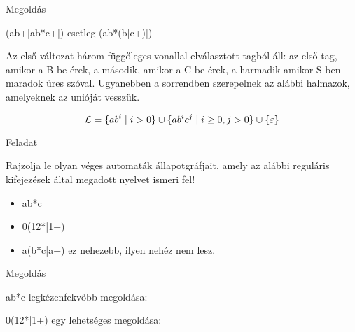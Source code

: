 \documentclass[
    ignorenonframetext
    ]{beamer}
\begin{document}
\begin{frame}
    {Megoldás}

    (ab+|ab*c+|) \quad esetleg \quad (ab*(b|c+)|)

    Az első változat három függőleges vonallal elválasztott tagból áll:
    az első tag, amikor a B-be érek, a második, amikor a C-be érek, a
    harmadik amikor S-ben maradok üres szóval. Ugyanebben a sorrendben
    szerepelnek az alábbi halmazok, amelyeknek az unióját vesszük.


    \[{\cal L} = \{ab^i \mid i>0\} \cup \{ab^ic^j \mid i \ge 0, j>0\}
    \cup \{\varepsilon\} \]
\end{frame}

\begin{frame}
    {Feladat}

    Rajzolja le olyan véges automaták állapotgráfjait, amely az alábbi
    reguláris kifejezések által megadott nyelvet ismeri fel!

    \begin{itemize}
        \item ab*c
        \item 0(12*|1+)
        \item a(b*c|a+)  ez nehezebb, ilyen nehéz nem lesz.
    \end{itemize}

    \megoldasjon
\end{frame}


\begin{frame}
    {Megoldás}

    ab*c legkézenfekvőbb megoldása:


\vfill
    0(12*|1+) egy lehetséges megoldása:

\end{frame}
\end{document}
